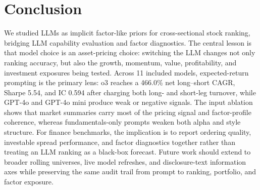 \section{Conclusion}

We studied LLMs as implicit factor-like priors for cross-sectional stock ranking, bridging LLM capability evaluation and factor diagnostics.
The central lesson is that model choice is an asset-pricing choice: switching the LLM changes not only ranking accuracy, but also the growth, momentum, value, profitability, and investment exposures being tested.
Across 11 included models, expected-return prompting is the primary lens: o3 reaches a 466.0\% net long--short CAGR, Sharpe 5.54, and IC 0.594 after charging both long- and short-leg turnover, while GPT-4o and GPT-4o mini produce weak or negative signals.
The input ablation shows that market summaries carry most of the pricing signal and factor-profile coherence, whereas fundamentals-only prompts weaken both alpha and style structure.
For finance benchmarks, the implication is to report ordering quality, investable spread performance, and factor diagnostics together rather than treating an LLM ranking as a black-box forecast.
Future work should extend to broader rolling universes, live model refreshes, and disclosure-text information axes while preserving the same audit trail from prompt to ranking, portfolio, and factor exposure.


